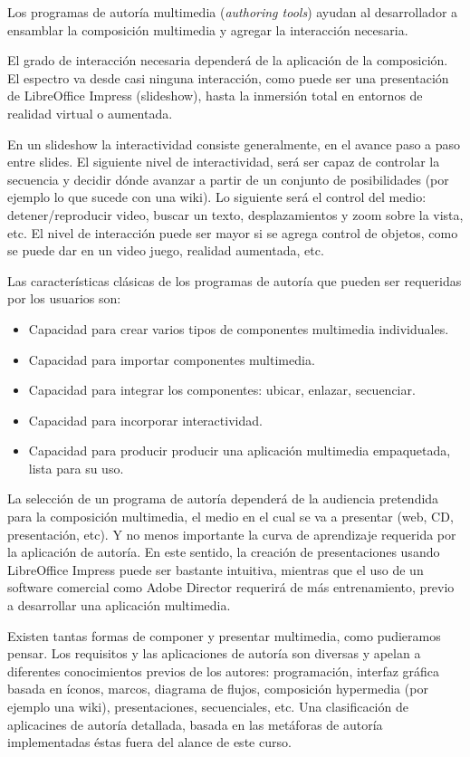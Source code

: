 \documentclass[12pt]{article}
\begin{document}
Los programas de autoría multimedia ({\it authoring tools}) ayudan al desarrollador
a ensamblar la composición multimedia y agregar la interacción necesaria. 

El grado de interacción necesaria dependerá de la aplicación de la 
composición. El espectro va desde casi ninguna interacción, como puede 
ser una presentación de LibreOffice Impress (slideshow), hasta la inmersión 
total en entornos de realidad virtual o aumentada. 

En un slideshow la interactividad consiste generalmente, en el avance 
paso a paso entre slides. El siguiente nivel de interactividad, será ser
capaz de controlar la secuencia y decidir dónde avanzar a partir de 
un conjunto de posibilidades (por ejemplo lo que sucede con una wiki). 
Lo siguiente será el control del medio: detener/reproducir video, 
buscar un texto, desplazamientos y zoom sobre la vista, etc.  
El nivel de interacción puede ser mayor si se agrega control de objetos, 
como se puede dar en un video juego, realidad aumentada, etc. 


Las características clásicas de los programas de autoría que pueden 
ser requeridas por los usuarios son: 

\begin{itemize}
\item Capacidad para crear varios tipos de componentes multimedia individuales.
\item Capacidad para importar componentes multimedia.
\item Capacidad para integrar los componentes: ubicar, enlazar, secuenciar. 
\item Capacidad para incorporar interactividad. 
\item Capacidad para producir producir una aplicación multimedia empaquetada, 
lista para su uso. 
\end{itemize}

La selección de un programa de autoría dependerá de la audiencia pretendida
para la composición multimedia, el medio en el cual se va a presentar (web, 
CD, presentación, etc). Y no menos importante la curva de aprendizaje 
requerida por la aplicación de autoría. En este sentido, la creación de 
presentaciones usando LibreOffice Impress puede ser bastante intuitiva, 
mientras que el uso de un software comercial como Adobe Director requerirá
de más entrenamiento, previo a desarrollar una aplicación multimedia.  

Existen tantas formas de componer y presentar multimedia, como 
pudieramos pensar. Los requisitos y las aplicaciones de autoría son diversas 
y apelan a diferentes conocimientos previos de los autores: programación, 
interfaz gráfica basada en íconos, marcos, diagrama de flujos, composición
hypermedia (por ejemplo una wiki), presentaciones, 
secuenciales, etc. Una clasificación de aplicacines de autoría
detallada, basada en las metáforas de autoría implementadas éstas fuera 
del alance de este curso.
\end{document}
